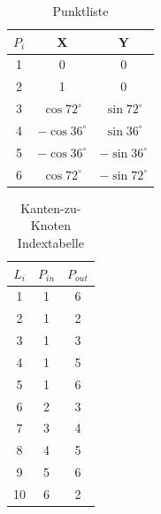 \documentclass[Protokollheft.tex]{subfiles}
\begin{document}
\begin{table}[h!]
	\begin{center}
	
	\label{tab:table1}
	\begin{tabular}{c|c|c} %
		$P_i$ & X & Y\\
		\hline
		1 & 0 & 0\\
		2 & 1 & 0\\
		3 & $\cos 72^\circ$ &$\sin 72^\circ$ \\
		4 & $-\cos 36^\circ$ &$\sin 36^\circ$ \\
		5 & $-\cos 36^\circ$ &$-\sin 36^\circ$ \\
		6 & $\cos 72^\circ$ &$-\sin 72^\circ$ \\
	\end{tabular}
	\end{center}
\caption{Punktliste}

\end{table}
\begin{table}[h!]
	\begin{center}
	
		\label{tab:table2}
		\begin{tabular}{c|c|c} %
			$L_i$ & $P_{in}$ & $P_{out}$\\
			\hline
			1 & 1 & 6\\
			2 & 1 & 2\\
			3 & 1 & 3\\
			4 & 1 & 5\\
			5 & 1 & 6\\
			6 & 2 & 3\\
			7 & 3 & 4\\
			8 & 4 & 5\\
			9 & 5 & 6\\
			10 & 6 & 2\\  
		\end{tabular}
			\end{center}
		\caption{Kanten-zu-Knoten Indextabelle}
	
\end{table}
\end{document}
